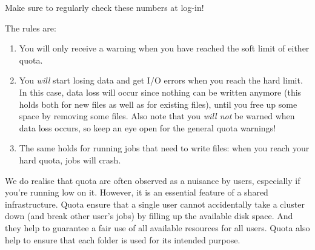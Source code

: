 Make sure to regularly check these numbers at log-in!
\fi  %

The rules are:
\begin{enumerate}
\item  You will only receive a warning when you have reached the soft limit of either quota.
\item  You \emph{will} start losing data and get I/O errors when you reach the hard limit. In this
  case, data loss will occur  since nothing can be written anymore (this holds
  both for new files as well as for existing files), until you free up
  some space by removing some files. Also note that you \emph{will not} be
  warned when data loss occurs, so keep an eye open for the general quota
  warnings!
\item  The same holds for running jobs that need to write files: when you reach
  your hard quota, jobs will crash.
\end{enumerate}

We do realise that quota are often observed as a nuisance by users, especially if you're running low on it.
However, it is an essential feature of a shared infrastructure. Quota ensure that a single user cannot
accidentally take a cluster down (and break other user's jobs) by filling up the available disk space.
And they help to guarantee a fair use of all available resources for all users. Quota also help to ensure
that each folder is used for its intended purpose.







